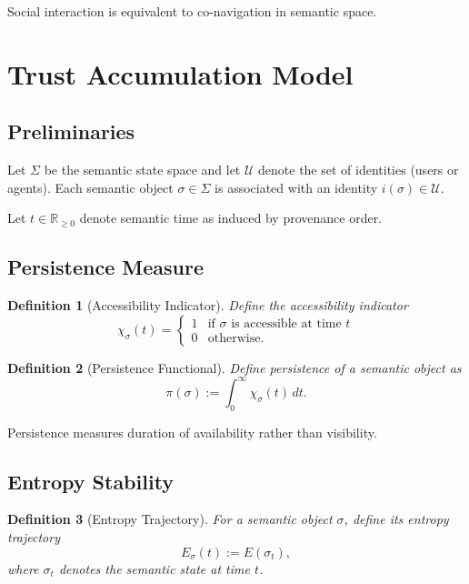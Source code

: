 \documentclass[11pt]{article}
\newtheorem{definition}{Definition}
\begin{document}
\begin{corollary}
Social interaction is equivalent to co-navigation in semantic space.
\end{corollary}

\section{Trust Accumulation Model}

\subsection{Preliminaries}

Let $\Sigma$ be the semantic state space and let $\mathcal{U}$ denote the set of identities
(users or agents). Each semantic object $\sigma \in \Sigma$ is associated with an identity
$i(\sigma) \in \mathcal{U}$.

Let $t \in \mathbb{R}_{\ge 0}$ denote semantic time as induced by provenance order.

\subsection{Persistence Measure}

\begin{definition}[Accessibility Indicator]
Define the accessibility indicator
\[
\chi_\sigma(t) =
\begin{cases}
1 & \text{if } \sigma \text{ is accessible at time } t \\
0 & \text{otherwise}.
\end{cases}
\]
\end{definition}

\begin{definition}[Persistence Functional]
Define persistence of a semantic object as
\[
\pi(\sigma) := \int_{0}^{\infty} \chi_\sigma(t)\, dt.
\]
\end{definition}

Persistence measures duration of availability rather than visibility.

\subsection{Entropy Stability}

\begin{definition}[Entropy Trajectory]
For a semantic object $\sigma$, define its entropy trajectory
\[
E_\sigma(t) := E(\sigma_t),
\]
where $\sigma_t$ denotes the semantic state at time $t$.
\end{definition}
\end{document}
